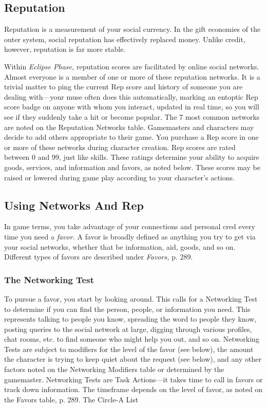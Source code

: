 \subsection{Reputation}

Reputation is a measurement of your social currency. 
In the gift economies of the outer system, social reputation
has effectively replaced money. Unlike credit,
however, reputation is far more stable.

Within \textit{Eclipse Phase,} reputation scores are facilitated
by online social networks. Almost everyone is a
member of one or more of these reputation networks. 
It is a trivial matter to ping the current Rep score and 
history of someone you are dealing with—your muse 
often does this automatically, marking an entoptic 
Rep score badge on anyone with whom you interact, 
updated in real time, so you will see if they suddenly 
take a hit or become popular. The 7 most common 
networks are noted on the Reputation Networks 
table. Gamemasters and characters may decide to add 
others appropriate to their game.
You purchase a Rep score in one or more of these 
networks during character creation. Rep scores are 
rated between 0 and 99, just like skills. These ratings 
determine your ability to acquire goods, services, and 
information and favors, as noted below. These scores 
may be raised or lowered during game play according 
to your character's actions.

\subsection{Using Networks And Rep}

In game terms, you take advantage of your connections
and personal cred every time you need a \textit{favor.}
A favor is broadly defined as anything you try to get 
via your social networks, whether that be information, 
aid, goods, and so on. Different types of favors are 
described under \textit{Favors,} p. 289.

\subsubsection{The Networking Test}

To pursue a favor, you start by looking around. This 
calls for a Networking Test to determine if you can 
find the person, people, or information you need. 
This represents talking to people you know, spreading
the word to people they know, posting queries to
the social network at large, digging through various 
profiles, chat rooms, etc. to find someone who might 
help you out, and so on.
Networking Tests are subject to modifiers for the 
level of the favor (see below), the amount the character
is trying to keep quiet about the request (see
below), and any other factors noted on the Networking
Modifiers table or determined by the gamemaster.
Networking Tests are Task Actions—it takes time 
to call in favors or track down information. The timeframe
depends on the level of favor, as noted on the
Favors table, p. 289.
The Circle-A List

